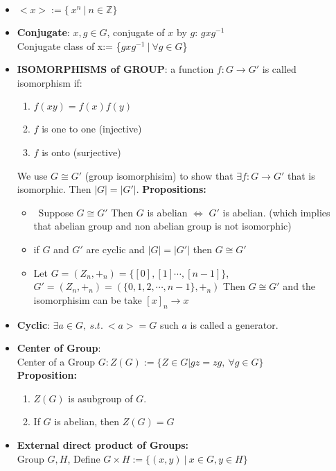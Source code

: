 \documentclass[12pt]{article}
\begin{document}
\begin{itemize}
        \item $<x> := \{\ x^n \ | \ n \in \mathbb{Z}\}$
        \item \textbf{Conjugate}: $x,g\in G$, conjugate of $x$ by $g$: $gxg^{-1}$\\
        Conjugate class of x:= \{$gxg^{-1} \ | \ \forall g \in G$\}
        \item \textbf{ISOMORPHISMS of GROUP}: a function $f : G \rightarrow G'$ is called isomorphism if:
        \begin{enumerate}
            \item $f(xy) = f(x)f(y)$
            \item $f$ is one to one (injective)
            \item $f$ is onto (surjective)
        \end{enumerate}
        We use $G \cong G'$ (group isomorphisim) to show that $\exists f:G \rightarrow G'$ that is isomorphic. Then $|G| = |G'|$.
        \textbf{Propositions:}
        \begin{itemize}
            \item \ Suppose $G\cong  G'$ Then $G$ is abelian $\Leftrightarrow$ $G'$ is abelian. (which implies that abelian group and non abelian group is not isomorphic)
            \item if $G$ and $G'$ are cyclic and $|G| = |G'|$ then $G\cong G'$ 
            \item Let $G = (Z_n, +_n) = \{[0], [1] \cdots, [n-1]\}$, $G' = (Z_n, +_n) = (\{0,1,2,\cdots, n-1\}, +_n)$
            Then $G\cong G'$ and the isomorphisim can be take $[x]_n \rightarrow x$
        \end{itemize}
        \item \textbf{Cyclic}: $\exists a \in G, \ s.t. \ <a> = G$ such $a$ is called a generator.
        \item \textbf{Center of Group}:\\
        Center of a Group $G: Z(G):= \{Z\in G | gz = zg, \ \forall g \in G\}$\\
        \textbf{Proposition:}
        \begin{enumerate}
            \item $Z(G)$ is asubgroup of $G$.
            \item If $G$ is abelian, then $Z(G) = G$
        \end{enumerate}
        \item \textbf{External direct product of Groups:}\\
        Group $G, H$, Define $G \times H :=\{(x,y) \ | \ x\in G, y \in H\}$\\

\end{itemize}
\end{document}
